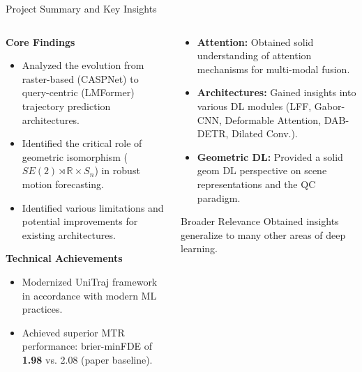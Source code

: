 \documentclass[10pt,aspectratio=169]{beamer}
\begin{document}
\begin{frame}{Project Summary and Key Insights}
    \begin{columns}[T]
        \begin{column}{0.55\textwidth}
            \textbf{Core Findings}
            \begin{itemize}
                \item Analyzed the evolution from raster-based (CASPNet) to query-centric (LMFormer) trajectory prediction architectures.
                \item Identified the critical role of geometric isomorphism ($SE(2) \rtimes \mathbb{R} \times S_n$) in robust motion forecasting.
                \item Identified various limitations and potential improvements for existing architectures.
            \end{itemize}

            \textbf{Technical Achievements}
            \begin{itemize}
                \item Modernized UniTraj framework in accordance with modern ML practices.
                \item Achieved superior MTR performance: brier-minFDE of \textbf{1.98} vs. 2.08 (paper baseline).
            \end{itemize}
        \end{column}
        \begin{column}{0.42\textwidth}
            \begin{itemize}
                \item \textbf{Attention:} Obtained solid understanding of attention mechanisms for multi-modal fusion.
                \item \textbf{Architectures:} Gained insights into various DL modules (LFF, Gabor-CNN, Deformable Attention, DAB-DETR, Dilated Conv.).
                \item \textbf{Geometric DL:} Provided a solid geom DL perspective on scene representations and the QC paradigm.
            \end{itemize}

            \begin{alertblock}{Broader Relevance}
                Obtained insights generalize to many other areas of deep learning.
            \end{alertblock}
        \end{column}
    \end{columns}
\end{frame}
\end{document}
